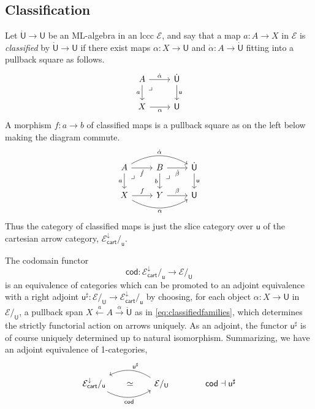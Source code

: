 \documentclass[12pt,reqno]{amsart}
\newcommand{\EE}{\ensuremath{\mathcal{E}}}
\renewcommand{\to}{\ensuremath{\rightarrow}}
\newcommand{\too}{\ensuremath{\longrightarrow}}
\renewcommand{\t}{\ensuremath{\mathsf{u}}}
\newcommand{\T}{\ensuremath{\mathsf{U}}}
\newcommand{\TT}{\ensuremath{\dot{\mathsf{U}}}}
\newcommand{\pbcorner}{\arrow[dr,phantom,"\lrcorner" very near start, shift right=.5ex]} %
\theoremstyle{remark}
\theoremstyle{definition}
\begin{document}
\subsection{Classification}\label{sec:classify}

Let $\TT \to \T$ be an ML-algebra in an lccc $\EE$, and say that a map $a : A\to X$ in $\EE$ is \emph{classified} by $\TT \to \T$ if there exist maps $\alpha : X \to \T$ and $\dot{\alpha} : A \to \TT$ fitting into a pullback square as follows.
\begin{equation}\label{eq:classifiedfamilies}
\begin{tikzcd}
	 A \ar[d, swap, "a"] \pbcorner \ar[r, "\dot{\alpha}"] & \TT \ar[d, "\t"] \\  
	X \ar[r, swap, "\alpha"] & \T 
 \end{tikzcd}
 \end{equation}
 A morphism $f : a \to b$ of classified maps is a pullback square as on the left below making the diagram commute.
 \begin{equation}\label{eq:classifiedfamilies2}
\begin{tikzcd}
	A \ar[d,swap, "a"] \ar[r,swap, "\dot{f}"]  \ar[rr, bend left, "\dot{\alpha}"]  \pbcorner & B \ar[d,swap, "b"]   \ar[r,swap,  "\dot{\beta}"] \pbcorner & \TT \ar[d, "\t"]  \\  
	X \ar[r, "f"] \ar[rr,swap, bend right, "\alpha"] & Y  \ar[r, "{\beta}"] &  \T
 \end{tikzcd}
 \end{equation}
 Thus the category of classified maps is just the slice category over $\t$ of the cartesian arrow category, $\EE^{\downarrow}_{\mathsf{cart}}/_{\t}$.

The codomain functor
\[
\mathsf{cod} : \EE^{\downarrow}_{\mathsf{cart}}/_{\t} \too \EE/_\T
\]
is an equivalence of categories which can be promoted to an adjoint equivalence with a right adjoint $\t^{\sharp} : \EE/_\T \to \EE^{\downarrow}_{\mathsf{cart}}/_{\t}$ by choosing, for each object $\alpha : X \to \T$ in $\EE/_\T$, a pullback span $X \stackrel{a}{\leftarrow} A \stackrel{\dot{\alpha}}{\to} \TT$ as in \eqref{eq:classifiedfamilies}, which determines the strictly functorial action on arrows uniquely.  As an adjoint, the functor $\t^{\sharp}$ is of course uniquely determined up to natural isomorphism.  Summarizing, we have an adjoint equivalence of 1-categories,
 \begin{equation}\label{eq:slice adjunction}
\begin{tikzcd}
 {\EE^{\downarrow}_{\mathsf{cart}}/_{\t}}  \ar[rr, bend right, swap, "{\mathsf{cod} }"] \ar[rr, phantom, description, "{\simeq}"] && \ar[ll, bend right, swap, "{\t^{\sharp}}"] \EE/_\T & \quad \mathsf{cod} \dashv \t^{\sharp}
 \end{tikzcd}
 \end{equation}
\end{document}

